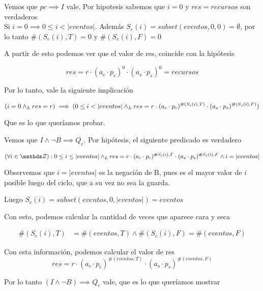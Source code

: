 \documentclass[document.tex]{subfiles}
\begin{document}
Vemos que $pc\implies I$ vale. Por hipotesis sabemos que $i=0$ y $res=recursos$ son verdaderos\\

Si $i=0 \implies 0\leq i < |eventos|$. Además $S_e(i)=subset(eventos,0,0)=\emptyset$, por lo tanto $\#(S_e(i),T)=0$ y $\#(S_e(i),F)=0$

A partir de esto podemos ver que el valor de res, coincide con la hipótesis

\begin{equation}
res=r\cdot(a_c\cdot p_c)^0\cdot (a_s\cdot p_s)^0=recursos
\end{equation}

Por lo tanto, vale la siguiente implicación

\begin{equation}
(i=0 \land _L res=r)\implies (0\leq i < |eventos| \land _L res=r\cdot(a_c\cdot p_c)^{\#(S_c(i),T)}\cdot(a_s\cdot p_s)^{\#(S_s(i),F)})
\end{equation}

Que es lo que queríamos probar.

Vemos que $I\land ¬B \implies Q_c$. Por hipótesis, el siguiente predicado es verdadero

\begin{equation}
(\forall i \in \ent): 0 \leq i \leq |eventos| \yLuego res=r\cdot (a_c\cdot p_c)^{\#S_c(i),T}\cdot (a_s\cdot p_s)^{\#S_s(i),F}
\land i=|eventos|
\end{equation}

Observemos que $i=|eventos|$ es la negación de B, pues es el mayor valor de $i$ posible luego del ciclo, que a su vez no sea la guarda.

Luego $S_c(i)=subset(eventos, 0, |eventos|)=eventos$

Con esto, podemos calcular la cantidad de veces que aparece cara y seca 

\begin{equation}
\begin{split}
    \#(S_c(i),T)&=\#(eventos,T)\land \#(S_c(i),F)=\#(eventos,F)
\end{split}
\end{equation}

Con esta información, podemos calcular el valor de res
\begin{equation}
res=r\cdot (a_c\cdot p_c)^{\#(eventos,T)}\cdot (a_s\cdot p_s)^{\#(eventos,F)}
\end{equation}

Por lo tanto $(I\land¬B)\implies Q_c$ vale, que es lo que queríamos mostrar

\end{document}
